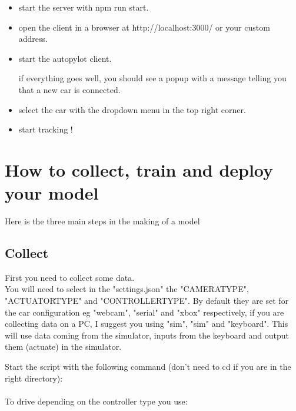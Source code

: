 \documentclass[12pt]{article}
\begin{document}
\begin{itemize}

\item start the server with npm run start.
\item open the client in a browser at http://localhost:3000/ or your custom address.
\item start the autopylot client. 

if everything goes well, you should see a popup with a message telling you that a new car is connected.\\

\item select the car with the dropdown menu in the top right corner.
\item start tracking !

\end{itemize}

\section{How to collect, train and deploy your model}
Here is the three main steps in the making of a model\\

\subsection{Collect}
First you need to collect some data.\\

You will need to select in the "settings.json" the "CAMERA\textunderscore TYPE", "ACTUATOR\textunderscore TYPE" and "CONTROLLER\textunderscore TYPE". By default they are set for the car configuration eg "webcam", "serial" and "xbox" respectively, if you are collecting data on a PC, I suggest you using "sim", "sim" and "keyboard". This will use data coming from the simulator, inputs from the keyboard and output them (actuate) in the simulator.


Start the script with the following command (don't need to cd if you are in the right directory):\\

\noindent{}\\

To drive depending on the controller type you use:\\
\end{document}
